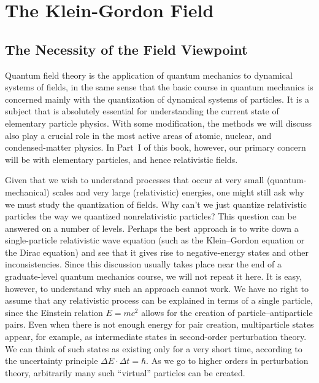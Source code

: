 \chapter{The Klein-Gordon Field}

\section{The Necessity of the Field Viewpoint}

Quantum field theory is the application of quantum mechanics to dynamical
systems of fields, in the same sense that the basic course in quantum
mechanics is concerned mainly with the quantization of dynamical systems
of particles.  It is a subject that is absolutely essential for
understanding the current state of elementary particle physics.  With some
modification, the methods we will discuss also play a crucial role in the
most active areas of atomic, nuclear, and condensed-matter physics.  In
Part~I of this book, however, our primary concern will be with elementary
particles, and hence relativistic fields.

Given that we wish to understand processes that occur at very small
(quantum-mechanical) scales and very large (relativistic) energies, one
might still ask why we must study the quantization of fields.  Why can't
we just quantize relativistic particles the way we quantized
nonrelativistic particles?  This question can be answered on a number of
levels.  Perhaps the best approach is to write down a single-particle
relativistic wave equation (such as the Klein--Gordon equation or the
Dirac equation) and see that it gives rise to negative-energy states and
other inconsistencies.  Since this discussion usually takes place near the
end of a graduate-level quantum mechanics course, we will not repeat it
here.  It is easy, however, to understand why such an approach cannot
work.  We have no right to assume that any relativistic process can be
explained in terms of a single particle, since the Einstein relation
$E=mc^2$ allows for the creation of particle--antiparticle pairs.  Even
when there is not enough energy for pair creation, multiparticle states
appear, for example, as intermediate states in second-order perturbation
theory.  We can think of such states as existing only for a very short
time, according to the uncertainty principle $\Delta E\cdot\Delta t =
\hbar$.  As we go to higher orders in perturbation theory, arbitrarily many
such ``virtual'' particles can be created.

